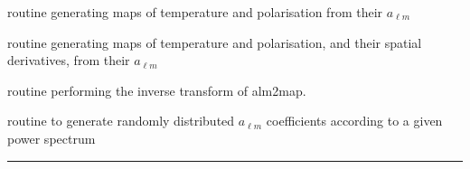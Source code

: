 \begin{related}
  \begin{sulist}{} %
   \item[\htmlref{alm2map}{sub:alm2map}] routine generating maps of temperature
   and polarisation from their  $a_{\ell m}$
   \item[\htmlref{alm2map\_der}{sub:alm2map_der}] routine generating maps of temperature
   and polarisation, and their spatial derivatives, from their  $a_{\ell m}$
   \item[\htmlref{map2alm\_spin}{sub:map2alm_spin}] routine performing the inverse transform
   of alm2map.
  \item[\htmlref{create\_alm}{sub:create_alm}] routine to generate randomly
  distributed $a_{\ell m}$ coefficients according to a given power spectrum
  \end{sulist}
\end{related}

\rule{\hsize}{2mm}

\newpage
